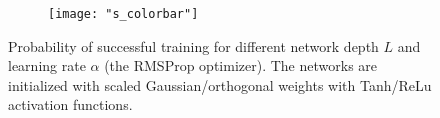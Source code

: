 \begin{figure}[h]
\begin{subfigure}{\myWidth}
  \label{fig:mnist_rmsprop_s4}
\end{subfigure}\myspace
\begin{subfigure}{8mm}
  \texttt{[image: "s\_colorbar"]}
\end{subfigure}%
\caption{Probability of successful training for different network depth $L$ and learning rate $\alpha$ (the RMSProp optimizer).  The networks are initialized with scaled Gaussian/orthogonal weights with Tanh/ReLu activation functions.
}
\label{fig:mnist_rmsprop}
\end{figure}